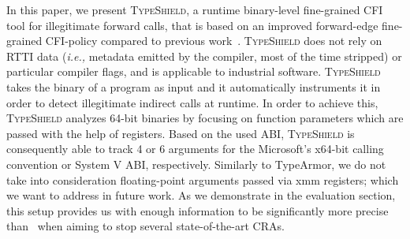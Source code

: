 In this paper, we present \textsc{TypeShield}, a runtime binary-level fine-grained CFI tool for illegitimate forward calls, 
that is based on an improved forward-edge fine-grained CFI-policy 
compared to previous work~\cite{veen:typearmor}. 
\textsc{TypeShield} does not rely on RTTI data (\textit{i.e.,} metadata emitted by the compiler, most of the time stripped) or 
particular compiler flags, and is applicable to industrial software.
\textsc{TypeShield} takes the binary of a program as input and it automatically instruments it in order
to detect illegitimate indirect calls at runtime. In order to achieve this, 
\textsc{TypeShield} analyzes 64-bit binaries by focusing on function parameters which are passed with the 
help of registers. Based on the used ABI, \textsc{TypeShield} is consequently able to track 4 or 6 arguments for the Microsoft's x64-bit calling convention or System V ABI, 
respectively. Similarly to TypeArmor, we do not take into consideration floating-point arguments passed via xmm registers; which we want to address in future work. 
As we demonstrate in the evaluation section, this setup provides us with enough information to be significantly more precise than~\cite{veen:typearmor} when aiming to stop several state-of-the-art CRAs.



